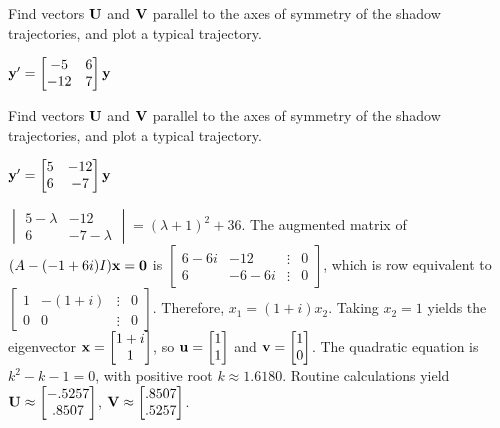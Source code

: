 \documentclass{ximera}
\begin{document}
 \begin{problem}\label{exer:10.6.33}   
 Find vectors
${\bf U}$ and ${\bf V}$ parallel to the axes of symmetry of the shadow
trajectories, and plot a typical trajectory.

$ {\bf y}'= \begin{bmatrix}-5&6\\-12&7\end{bmatrix}{\bf y}$
 \end{problem}

 \begin{problem}\label{exer:10.6.34}  
 Find vectors
${\bf U}$ and ${\bf V}$ parallel to the axes of symmetry of the shadow
trajectories, and plot a typical trajectory.

$ {\bf y}'= \begin{bmatrix}5&-12\\6&-7\end{bmatrix}{\bf y}$

\begin{solution}
    $\begin{vmatrix}5-\lambda&-12\\6&-7-\lambda
\end{vmatrix}=(\lambda+1)^2+36$.
The augmented matrix of $(A-(-1+6i)I){\bf x}={\bf 0}$ is
$ \begin{bmatrix}6-6i&-12&\vdots&0\\
6&-6-6i&\vdots&0  \end{bmatrix}$,
which is row equivalent to
$ \begin{bmatrix} 1&-(1+i)&\vdots&0\\ 0&0&\vdots&0
 \end{bmatrix}$.
Therefore, $x_1=(1+i)x_2$. Taking $x_2=1$
yields the eigenvector
 ${\bf x}= \begin{bmatrix}1+i\\1 \end{bmatrix}$,
so ${\bf u}=  \begin{bmatrix}1\\1\end{bmatrix}$ and ${\bf v}=  \begin{bmatrix}1\\0\end{bmatrix}$.
The quadratic equation is $k^2-k-1=0$, with positive root
$k\approx1.6180$.
 Routine calculations yield
 ${\bf U}\approx  \begin{bmatrix}-.5257\\.8507\end{bmatrix}$,
${\bf V}\approx  \begin{bmatrix}.8507\\.5257\end{bmatrix}$.
\end{solution}
 \end{problem}
 
\end{document}
